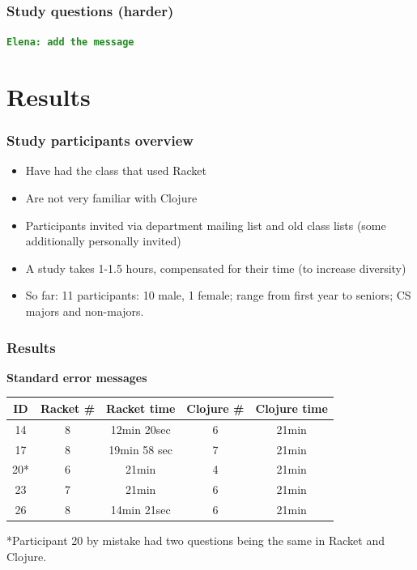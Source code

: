 \documentclass{beamer}
\newcommand{\comment}[1]{{\bf \tt  {#1}}}
\newcommand{\emcomment}[1]{\textcolor{ForestGreen}{\comment{Elena: {#1}}}}
\begin{document}
\begin{frame}[fragile]
\frametitle{Study questions (harder)}
\emcomment{add the message}
\end{frame}

\section{Results}

\begin{frame}
\frametitle{Study participants overview}
\begin{itemize}
\item Have had the class that used Racket
\item Are not very familiar with Clojure 
\item Participants invited via department mailing list and old class lists (some additionally personally invited)
\item A study takes 1-1.5 hours, compensated for their time (to increase diversity)
\item So far: 11 participants: 10 male, 1 female; range from first year to seniors; CS majors and non-majors.  
\end{itemize}
\end{frame}

\begin{frame}
\frametitle{Results}
{\bf Standard error messages} 
\vspace{0.1in}

\begin{tabular}{c | c| c| c | c }
\hline
{\bf ID} & {\bf Racket  \#} & {\bf Racket time} & {\bf Clojure  \#} & {\bf Clojure time} \\
\hline 
14 &  8 & 12min 20sec &  6  &  21min \\
17 &  8 & 19min 58 sec &  7 &  21min \\
20* &  6 & 21min &  4 &  21min \\
23 &  7 & 21min &  6  &  21min \\
26 &  8 & 14min 21sec &  6 &  21min \\
\hline
\end{tabular}

*Participant 20 by mistake had two questions being the same in Racket and Clojure. 
\end{frame}
\end{document}
